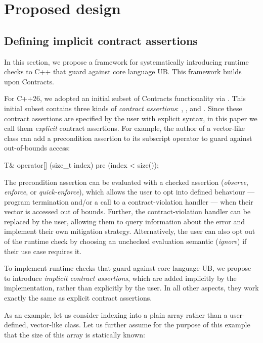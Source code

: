 
\section{Proposed design}
\label{design}

\subsection{Defining implicit contract assertions}
\label{defineicas}

In this section, we propose a framework for systematically introducing runtime checks to C++ that guard against core language UB. This framework builds upon Contracts.

For C++26, we adopted an initial subset of Contracts functionality via \cite{P2900R14}. This initial subset contains three kinds of \emph{contract assertions}: , , and . Since these contract assertions are specified by the user with explicit syntax, in this paper we call them \emph{explicit} contract assertions. For example, the author of a vector-like class can add a precondition assertion to its subscript operator to guard against out-of-bounds access:

\begin{codeblock}
T& operator[] (size_t index)
  pre (index < size());
\end{codeblock}

The precondition assertion  can be evaluated with a checked assertion  (\emph{observe}, \emph{enforce}, or \emph{quick-enforce}), which allows the user to opt into defined behaviour --- program termination and/or a call to a contract-violation handler --- when their vector is accessed out of bounds. Further, the contract-violation handler can be replaced by the user, allowing them to query information about the error and implement their own mitigation strategy. Alternatively, the user can also opt out of the runtime check by choosing an unchecked evaluation semantic (\emph{ignore}) if their use case requires it.

To implement runtime checks that guard against core language UB, we propose to introduce \emph{implicit contract assertions}, which are added implicitly by the implementation, rather than explicitly by the user. In all other aspects, they work exactly the same as explicit contract assertions.

As an example, let us consider indexing into a plain array rather than a user-defined, vector-like class. Let us further assume for the purpose of this example that the size  of this array is statically known:

